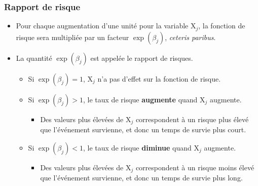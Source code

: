 \documentclass{beamer}
\begin{document}
\begin{frame}
\frametitle{Rapport de risque}
\begin{itemize}
\item Pour chaque augmentation d'une unité pour la variable $\mathrm{X}_j$, la fonction de risque sera \alert{multipliée} par un facteur $\exp(\beta_j)$, \textit{ceteris paribus}.
\item La quantité $\exp(\beta_j)$ est appelée le \alert{rapport de risques}.
\begin{itemize}
\vp \vp
\item Si $\exp(\beta_j)=1$,  $\mathrm{X}_j$ n'a pas d'effet sur la fonction de risque.
\item Si $\exp(\beta_j)>1$, le taux de risque \textbf{augmente} quand $\mathrm{X}_j$ augmente. 
\begin{itemize}
\vp \vp
\item Des valeurs plus élevées de $\mathrm{X}_j$ correspondent à un risque plus élevé que l'événement survienne, et donc un temps de survie plus court.
\end{itemize}
\item Si $\exp(\beta_j)<1$, le taux de risque \textbf{diminue} quand $\mathrm{X}_j$ augmente. 
\begin{itemize}
\vp \vp
\item Des valeurs plus élevées de $\mathrm{X}_j$ correspondent à un risque moins élevé que l'événement survienne, et donc un temps de survie plus long.
\end{itemize}
\end{itemize}
\end{itemize}
\end{frame}
\end{document}
